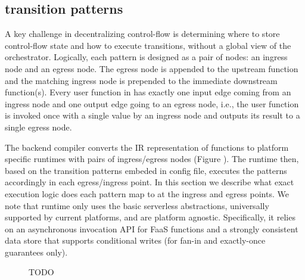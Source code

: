 


\subsection{ transition patterns  }


A key challenge in decentralizing control-flow is determining where to store
control-flow state and how to execute transitions, without a global view of the orchestrator. 
Logically, each pattern is designed as
a pair of nodes: an ingress node and an egress node. The egress node is appended to the
upstream function and the matching ingress node is prepended to the immediate
downstream function(s).
Every user function in
\name{} has exactly one input edge coming from an ingress node and one output
edge going to an egress node, i.e., the user function is invoked once with a
single value by an ingress node and outputs its result to a single egress
node. 

The \name{} backend compiler converts the IR representation of functions  to platform specific \name{} runtimes with pairs of ingress/egress nodes (Figure ). The runtime then, based on the transition patterns embeded in \name{} config file, executes the patterns accordingly in each egress/ingress point. In this section we describe what exact execution logic does each pattern map to at the ingress and egress points. We note that \name{} runtime only uses the basic serverless abstractions, universally supported by current platforms, and are platform agnostic.
Specifically, it relies
on an asynchronous invocation API for FaaS functions and a strongly consistent
data store that supports conditional writes (for fan-in and exactly-once guarantees only). 

 \begin{figure}[t!]
 	\centering
 	\caption{TODO}
 	\label{fig:transition}
 \end{figure}

